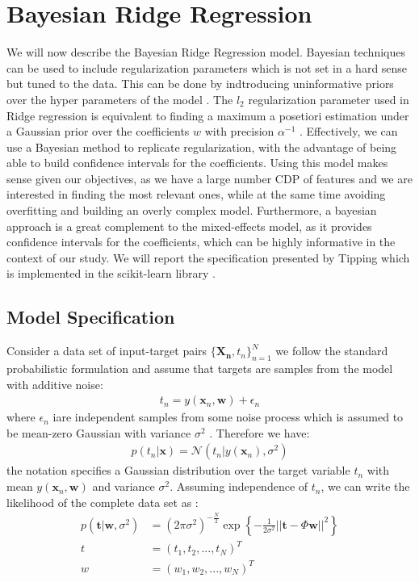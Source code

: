 \section{Bayesian Ridge Regression}
We will now describe the Bayesian Ridge Regression model. Bayesian techniques can be used to include regularization parameters which is not set in a hard sense but tuned to the data. This can be done by indtroducing uninformative priors over the hyper parameters of the model \cite{scikit-learn, mackay_bayesian_1992}. The $l_2$ regularization parameter used in Ridge regression is equivalent to finding a maximum a posetiori estimation under a Gaussian prior over the coefficients $w$ with precision $\alpha^{-1}$ \cite{scikit-learn}. Effectively, we can use a Bayesian method to replicate regularization, with the advantage of being able to build confidence intervals for the coefficients. Using this model makes sense given our objectives, as we have a large number CDP of features and we are interested in finding the most relevant ones, while at the same time avoiding overfitting and building an overly complex model. Furthermore, a bayesian approach is a great complement to the mixed-effects model, as it provides confidence intervals for the coefficients, which can be highly informative in the context of our study. We will report the specification presented by Tipping \cite{tipping} which is implemented in the scikit-learn library \cite{scikit-learn}.

\subsection{Model Specification}
Consider a data set of input-target pairs $\{\mathbf{X_n}, t_n\}^N_{n = 1}$ we follow the standard probabilistic formulation and assume that targets are samples from the model with additive noise: 
\begin{align}
    t_n = y(\mathbf{x}_n, \mathbf{w}) + \epsilon_n
\end{align}
where $\epsilon_n$ iare independent samples from some noise process which is assumed to be mean-zero Gaussian with variance $\sigma^2$ \cite{tipping}. Therefore we have:
\begin{align}
    p(t_n|\mathbf{x}) = \mathcal{N}(t_n|y(\mathbf{x}_n), \sigma^2)
\end{align}
the notation specifies a Gaussian distribution over the target variable $t_n$ with mean $y(\mathbf{x}_n, \mathbf{w})$ and variance $\sigma^2$. Assuming independence of $t_n$, we can write the likelihood of the complete data set as \cite{tipping}:
\begin{align}
    p(\mathbf{t}| \mathbf{w}, \sigma^2) &= (2 \pi \sigma^2)^{-\frac{N}{2}} \exp\left\{-\frac{1}{2\sigma^2}||\mathbf{t} - \Phi \mathbf{w}||^2\right\} \\
    t &= (t_1, t_2, ..., t_N)^T \\
    w &= (w_1, w_2, ..., w_N)^T
\end{align}

